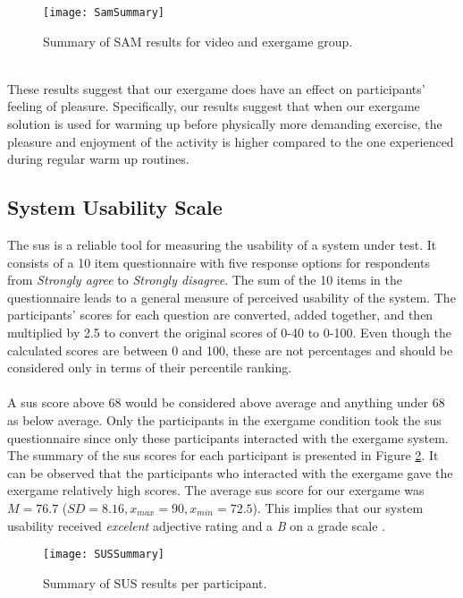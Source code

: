 \begin{figure}[h]
    \centering
    \texttt{[image: SamSummary]}
    \caption{Summary of SAM results for video and exergame group.}
    \label{fig:sam}
\end{figure}\\
These results suggest that our exergame does have an effect on participants' feeling of pleasure. Specifically, our results suggest that when our exergame solution is used for warming up before physically more demanding exercise, the pleasure and enjoyment of the activity is higher compared to the one experienced during regular warm up routines.
\subsection{System Usability Scale}
The \acrfull{sus} is a reliable tool for measuring the usability of a system under test. It consists of a 10 item questionnaire with five response options for respondents from \textit{Strongly agree} to \textit{Strongly disagree}. The sum of the 10 items in the questionnaire leads to a general measure of perceived usability of the system. The participants' scores for each question are converted, added together, and then multiplied by 2.5 to convert the original scores of 0-40 to 0-100. Even though the calculated scores are between  0 and 100, these are not percentages and should be considered only in terms of their percentile ranking.\\\\ A \acrshort{sus} score above 68 would be considered above average and anything under 68 as below average. Only the participants in the exergame condition took the \acrshort{sus} questionnaire since only these participants interacted with the exergame system. The summary of the \acrshort{sus} scores for each participant is presented in Figure \ref{fig:sus}. It can be observed that the participants who interacted with the exergame gave the exergame relatively high scores. The  average \acrshort{sus} score for our exergame  was \begin{math}M = 76.7 \end{math} (\begin{math} SD = 8.16, x_{max}= 90, x_{min}= 72.5\end{math}). This implies that our system usability received \textit{excelent} adjective rating and a \textit{B} on a grade scale \cite{brooke2013sus}.
\begin{figure}[h]
    \centering
    \texttt{[image: SUSSummary]}
    \caption{Summary of SUS results per participant.}
    \label{fig:sus}
\end{figure}\\
